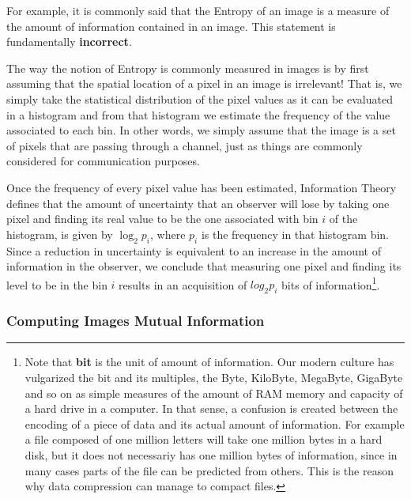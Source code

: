 For example, it is commonly said that \textrm{the Entropy of an image is a
measure of the amount of information contained in an image}. This statement is
fundamentally \textbf{incorrect}. 

The way the notion of Entropy is commonly measured in images is by first
assuming that the spatial location of a pixel in an image is irrelevant!  That
is, we simply take the statistical distribution of the pixel values as it can
be evaluated in a histogram and from that histogram we estimate the frequency
of the value associated to each bin. In other words, we simply assume that the
image is a set of pixels that are passing through a channel, just as things are
commonly considered for communication purposes.

Once the frequency of every pixel value has been estimated, Information Theory
defines that the amount of uncertainty that an observer will lose by taking one
pixel and finding its real value to be the one associated with bin $i$ of the
histogram, is given by $\log_2{p_i}$, where $p_i$ is the frequency in that
histogram bin. Since a reduction in uncertainty is equivalent to an increase in
the amount of information in the observer, we conclude that measuring one pixel
and finding its level to be in the bin $i$ results in an acquisition of
$log_2{p_i}$ bits of information\footnote{Note that \textbf{bit} is the unit of
amount of information. Our modern culture has vulgarized the bit and its
multiples, the Byte, KiloByte, MegaByte, GigaByte and so on as simple measures
of the amount of RAM memory and capacity of a hard drive in a computer. In that
sense, a confusion is created between the encoding of a piece of data and its
actual amount of information. For example a file composed of one million
letters will take one million bytes in a hard disk, but it does not necessariy
has one million bytes of information, since in many cases parts of the file can
be predicted from others. This is the reason why data compression can manage to
compact files.}.

\ifitkFullVersion 

\fi

\subsubsection{Computing Images Mutual Information}
\label{sec:ComputingImagesMutualInformation}

\ifitkFullVersion 

\fi



